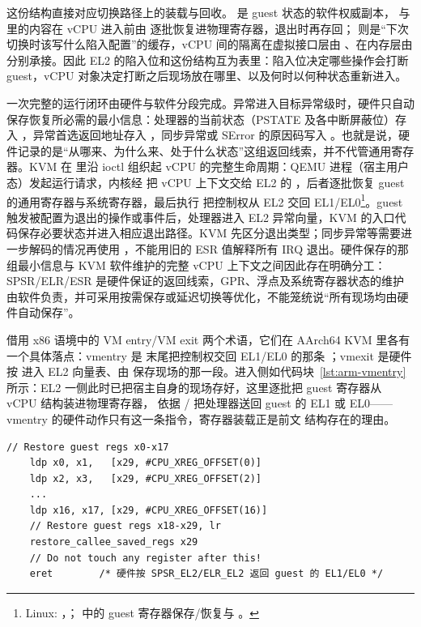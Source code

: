 这份结构直接对应切换路径上的装载与回收。 是 guest 状态的软件权威副本， 与  里的内容在 vCPU 进入前由  逐批恢复进物理寄存器，退出时再存回； 则是“下次切换时该写什么陷入配置”的缓存，vCPU 间的隔离在虚拟接口层由 、在内存层由  分别承接。因此 EL2 的陷入位和这份结构互为表里：陷入位决定哪些操作会打断 guest，vCPU 对象决定打断之后现场放在哪里、以及何时以何种状态重新进入。

一次完整的运行闭环由硬件与软件分段完成。异常进入目标异常级时，硬件只自动保存恢复所必需的最小信息：处理器的当前状态（PSTATE 及各中断屏蔽位）存入 ，异常首选返回地址存入 ，同步异常或 SError 的原因码写入 \cite{source4}。也就是说，硬件记录的是“从哪来、为什么来、处于什么状态”这组返回线索，并不代管通用寄存器。KVM 在  里沿  ioctl 组织起 vCPU 的完整生命周期：QEMU 进程（宿主用户态）发起运行请求，内核经  把 vCPU 上下文交给 EL2 的 ，后者逐批恢复 guest 的通用寄存器与系统寄存器，最后执行  把控制权从 EL2 交回 EL1/EL0\footnote{Linux: ，； 中的 guest 寄存器保存/恢复与 。}。guest 触发被配置为退出的操作或事件后，处理器进入 EL2 异常向量，KVM 的入口代码保存必要状态并进入相应退出路径。KVM 先区分退出类型；同步异常等需要进一步解码的情况再使用 ，不能用旧的 ESR 值解释所有 IRQ 退出。硬件保存的那组最小信息与 KVM 软件维护的完整 vCPU 上下文之间因此存在明确分工：SPSR/ELR/ESR 是硬件保证的返回线索，GPR、浮点及系统寄存器状态的维护由软件负责，并可采用按需保存或延迟切换等优化，不能笼统说“所有现场均由硬件自动保存”\cite{source4,source5}。

借用 x86 语境中的 VM entry/VM exit 两个术语，它们在 AArch64 KVM 里各有一个具体落点：vmentry 是  末尾把控制权交回 EL1/EL0 的那条 ；vmexit 是硬件按  进入 EL2 向量表、由  保存现场的那一段。进入侧如代码块~\ref{lst:arm-vmentry} 所示：EL2 一侧此时已把宿主自身的现场存好，这里逐批把 guest 寄存器从 vCPU 结构装进物理寄存器， 依据 / 把处理器送回 guest 的 EL1 或 EL0——vmentry 的硬件动作只有这一条指令，寄存器装载正是前文  结构存在的理由。

\begin{lstlisting}[caption={vmentry 的硬件形态：\_\_guest\_enter 尾部恢复 guest 寄存器后 eret 返回（arch/arm64/kvm/hyp/entry.S，节选）},label={lst:arm-vmentry}]
	// Restore guest regs x0-x17
	ldp	x0, x1,   [x29, #CPU_XREG_OFFSET(0)]
	ldp	x2, x3,   [x29, #CPU_XREG_OFFSET(2)]
	...
	ldp	x16, x17, [x29, #CPU_XREG_OFFSET(16)]
	// Restore guest regs x18-x29, lr
	restore_callee_saved_regs x29
	// Do not touch any register after this!
	eret        /* 硬件按 SPSR_EL2/ELR_EL2 返回 guest 的 EL1/EL0 */
\end{lstlisting}

